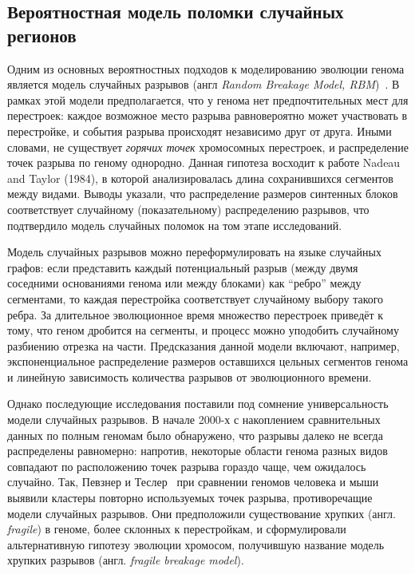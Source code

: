 \subsection{Вероятностная модель поломки случайных регионов}
\label{subsec:random_breakage}

Одним из основных вероятностных подходов к моделированию эволюции генома является модель случайных разрывов (англ \textit{Random Breakage Model, RBM})~\cite{Lin2008}.
В рамках этой модели предполагается, что у генома нет предпочтительных мест для перестроек: каждое возможное место разрыва равновероятно может участвовать в перестройке, и события разрыва происходят независимо друг от друга.
Иными словами, не существует \textit{горячих точек} хромосомных перестроек, и распределение точек разрыва по геному однородно.
Данная гипотеза восходит к работе Nadeau and Taylor (1984), в которой анализировалась длина сохранившихся сегментов между видами.
Выводы указали, что распределение размеров синтенных блоков соответствует случайному (показательному) распределению разрывов, что подтвердило модель случайных поломок на том этапе исследований.

Модель случайных разрывов можно переформулировать на языке случайных графов: если представить каждый потенциальный разрыв (между двумя соседними основаниями генома или между блоками) как ``ребро'' между сегментами, то каждая перестройка соответствует случайному выбору такого ребра.
За длительное эволюционное время множество перестроек приведёт к тому, что геном дробится на сегменты, и процесс можно уподобить случайному разбиению отрезка на части.
Предсказания данной модели включают, например, экспоненциальное распределение размеров оставшихся цельных сегментов генома и линейную зависимость количества разрывов от эволюционного времени.

Однако последующие исследования поставили под сомнение универсальность модели случайных разрывов.
В начале 2000-х с накоплением сравнительных данных по полным геномам было обнаружено, что разрывы далеко не всегда распределены равномерно: напротив, некоторые области генома разных видов совпадают по расположению точек разрыва гораздо чаще, чем ожидалось случайно.
Так, Певзнер и Теслер~\cite{Pevzner03} при сравнении геномов человека и мыши выявили кластеры повторно используемых точек разрыва, противоречащие модели случайных разрывов.
Они предположили существование хрупких (англ. \textit{fragile}) в геноме, более склонных к перестройкам, и сформулировали альтернативную гипотезу эволюции хромосом, получившую название модель хрупких разрывов (англ. \textit{fragile breakage model}).

